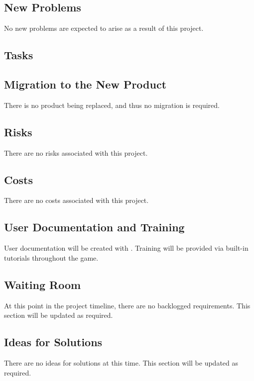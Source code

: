 \documentclass[12pt, titlepage]{article}
\begin{document}
\subsection{New Problems}
No new problems are expected to arise as a result of this project.
\subsection{Tasks}

\subsection{Migration to the New Product}
There is no product being replaced, and thus no migration is required.
\subsection{Risks}
There are no risks associated with this project.
\subsection{Costs}
There are no costs associated with this project.
\subsection{User Documentation and Training}
User documentation will be created with .  Training will be provided via built-in tutorials throughout the game.
\subsection{Waiting Room}
At this point in the project timeline, there are no backlogged requirements.  This section will be updated as required.
\subsection{Ideas for Solutions}
There are no ideas for solutions at this time.  This section will be updated as required.
\end{document}
